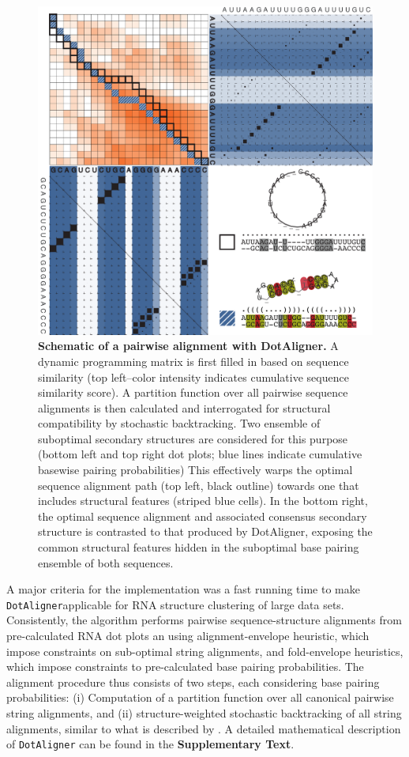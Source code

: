 \documentclass[a4paper,11pt]{article}
\newcommand\dotaligner{\texttt{DotAligner}}
\begin{document}
\begin{figure}
 \includegraphics[width=\textwidth]{figX}
\caption { \textbf{Schematic of a pairwise alignment with DotAligner. }
  A dynamic  programming matrix is first filled in based on sequence 
  similarity (top left--color intensity indicates cumulative sequence similarity score). 
  A partition function over all pairwise sequence alignments is then calculated and 
  interrogated for structural compatibility by stochastic backtracking. 
  Two ensemble of suboptimal secondary structures are considered for this purpose
  (bottom left and top right dot plots; blue lines indicate cumulative basewise pairing probabilities)      This effectively warps the optimal  sequence alignment path (top left, black outline) towards one that includes structural features (striped blue cells).  In the bottom right, the optimal sequence alignment 
  and associated consensus secondary structure is contrasted to that produced 
  by DotAligner, exposing the common structural features hidden in the suboptimal 
  base pairing ensemble of both sequences. 
 }
\end{figure}

A major criteria for the implementation was a fast running time to make 
\dotaligner applicable for RNA structure clustering of large data sets.
Consistently, the algorithm performs pairwise sequence-structure alignments from 
pre-calculated RNA dot plots an using alignment-envelope heuristic, which 
impose constraints on sub-optimal string alignments, and fold-envelope 
heuristics, which impose constraints to pre-calculated base pairing probabilities.
The alignment procedure thus consists of two steps, each considering base pairing  
probabilities: (i) Computation of a partition function over all canonical pairwise 
string alignments, and (ii) structure-weighted stochastic backtracking of 
all string alignments, similar to what is described by \cite{muckstein2002stochastic}. 
A detailed mathematical description of \dotaligner{} can be found 
 in the \textbf{Supplementary Text}.\\
\end{document}
